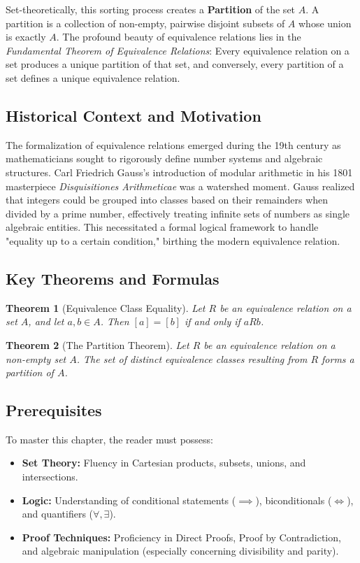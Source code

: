 \documentclass[11pt, a4paper]{article}
\newtheorem{theorem}{Theorem}[section]
\theoremstyle{definition}
\theoremstyle{remark}
\begin{document}
Set-theoretically, this sorting process creates a \textbf{Partition} of the set $A$. A partition is a collection of non-empty, pairwise disjoint subsets of $A$ whose union is exactly $A$. The profound beauty of equivalence relations lies in the \textit{Fundamental Theorem of Equivalence Relations}: Every equivalence relation on a set produces a unique partition of that set, and conversely, every partition of a set defines a unique equivalence relation.

\subsection{Historical Context and Motivation}
The formalization of equivalence relations emerged during the 19th century as mathematicians sought to rigorously define number systems and algebraic structures. Carl Friedrich Gauss's introduction of modular arithmetic in his 1801 masterpiece \textit{Disquisitiones Arithmeticae} was a watershed moment. Gauss realized that integers could be grouped into classes based on their remainders when divided by a prime number, effectively treating infinite sets of numbers as single algebraic entities. This necessitated a formal logical framework to handle "equality up to a certain condition," birthing the modern equivalence relation.

\subsection{Key Theorems and Formulas}
\begin{theorem}[Equivalence Class Equality]
Let $R$ be an equivalence relation on a set $A$, and let $a, b \in A$. Then $[a] = [b]$ if and only if $a R b$.
\end{theorem}
\begin{theorem}[The Partition Theorem]
Let $R$ be an equivalence relation on a non-empty set $A$. The set of distinct equivalence classes resulting from $R$ forms a partition of $A$.
\end{theorem}

\subsection{Prerequisites}
To master this chapter, the reader must possess:
\begin{itemize}
    \item \textbf{Set Theory:} Fluency in Cartesian products, subsets, unions, and intersections.
    \item \textbf{Logic:} Understanding of conditional statements ($\implies$), biconditionals ($\iff$), and quantifiers ($\forall, \exists$).
    \item \textbf{Proof Techniques:} Proficiency in Direct Proofs, Proof by Contradiction, and algebraic manipulation (especially concerning divisibility and parity).
\end{itemize}
\end{document}
